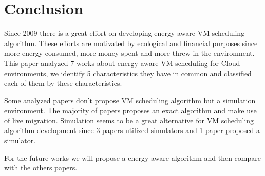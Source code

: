 \documentclass{article}
\begin{document}







\section{Conclusion}

Since 2009 there is a great effort on developing energy-aware VM scheduling algorithm. These efforts are motivated by ecological and financial purposes since more energy consumed, more money spent and more  threw in the environment. This paper analyzed 7 works about energy-aware VM scheduling for Cloud environments, we identify 5 characteristics they have in common and classified each of them by these characteristics. 

Some analyzed papers don't propose VM scheduling algorithm but a simulation environment. The majority of papers proposes an exact algorithm and make use of live migration. Simulation seems to be a great alternative for VM scheduling algorithm development since 3 papers utilized simulators and 1 paper proposed a simulator. 


For the future works we will propose a energy-aware algorithm and then compare with the others papers.



\end{document}
